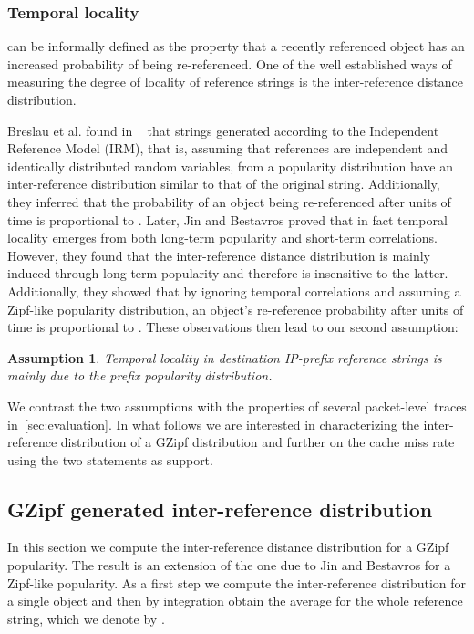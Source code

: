 \documentclass[twocolumn, 10pt]{article}
\theoremstyle{plain}
\newtheorem{assumption}{Assumption}
\begin{document}
\subsubsection{Temporal locality} can be informally defined as the property that a recently
referenced object has an increased probability of being re-referenced. 
One of the well established ways of measuring the degree of locality of
reference strings is the inter-reference distance distribution. 



Breslau et al. found in ~\cite{breslau:web_and_zipf} that strings generated
according to the Independent Reference Model (IRM), that is, assuming that
references are independent and identically distributed random variables, from
a popularity distribution have an inter-reference distribution similar to that
of the original string. Additionally, they inferred that the probability of an
object being re-referenced after  units of time is proportional to .
Later, Jin and Bestavros proved that in fact temporal locality emerges from
both long-term popularity and short-term correlations. However, they found
that the inter-reference distance distribution is mainly induced through
long-term popularity and therefore is insensitive to the latter. Additionally,
they showed that by ignoring temporal correlations and assuming a Zipf-like
popularity distribution, an object's re-reference probability after  units
of time is proportional to  . These observations then lead
to our second assumption:

\begin{assumption}\label{prop:tloc}
    Temporal locality in destination IP-prefix reference strings is mainly due
    to the prefix popularity distribution.
\end{assumption}

We contrast the two assumptions with the properties of several packet-level
traces in~\ref{sec:evaluation}. In what follows we are interested in
characterizing the inter-reference distribution of a GZipf distribution and
further on the cache miss rate using the two statements as support.

\subsection{GZipf generated inter-reference distribution}

In this section we compute the inter-reference distance distribution for a GZipf
popularity. The result is an extension of the one due to Jin and Bestavros for
a Zipf-like popularity. As a first step we compute the inter-reference
distribution for a single object and then by integration obtain the average
for the whole reference string, which we denote by .
\end{document}
